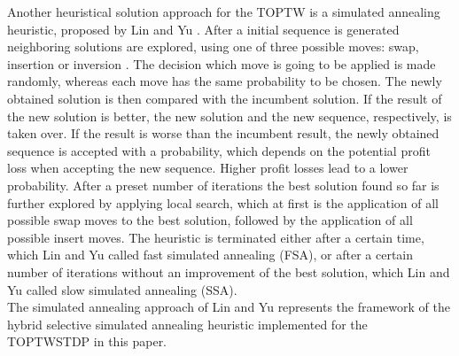 \documentclass[final,5p,times,twocolumn]{elsarticle}
\begin{document}
Another heuristical solution approach for the TOPTW is a simulated annealing heuristic, proposed by Lin and Yu \cite{Lin:2012sa}. After a initial sequence is generated neighboring solutions are explored, using one of three possible moves: swap, insertion or inversion \cite{Gavalas:2014ttd}. The decision which move is going to be applied is made randomly, whereas each move has the same probability to be chosen. The newly obtained solution is then compared with the incumbent solution. If the result of the new solution is better, the new solution and the new sequence, respectively, is taken over. If the result is worse than the incumbent result, the newly obtained sequence is accepted with a probability, which depends on the potential profit loss when accepting the new sequence. Higher profit losses lead to a lower probability. After a preset number of iterations the best solution found so far is further explored by applying local search, which at first is the application of all possible swap moves to the best solution, followed by the application of all possible insert moves. The heuristic is terminated either after a certain time, which Lin and Yu \cite{Lin:2012sa} called fast simulated annealing (FSA), or after a certain number of iterations without an improvement of the best solution, which Lin and Yu \cite{Lin:2012sa} called slow simulated annealing (SSA).\\
The simulated annealing approach of Lin and Yu \cite{Lin:2012sa} represents the framework of the hybrid selective simulated annealing heuristic implemented for the TOPTWSTDP in this paper. 
\end{document}
